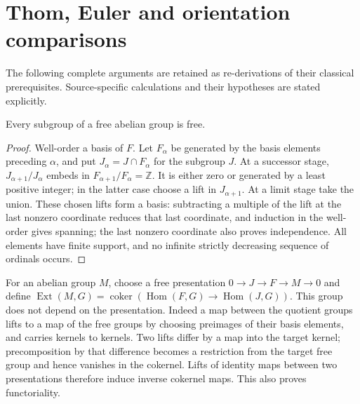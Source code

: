 \section{Thom, Euler and orientation comparisons}\label{courseIII:thom-euler-for-lesson11:section}

The following complete arguments are retained as re-derivations of their classical prerequisites. Source-specific calculations and their hypotheses are stated explicitly.

\label{courseIII:thom-euler-for-lesson11:CG-S6-CHAIN-LEMMA-5.1}

\begin{lemma}
Every subgroup of a free abelian group is free.
\end{lemma}
\begin{proof}
Well-order a basis of \(F\). Let \(F_\alpha\) be generated by the basis elements preceding \(\alpha\), and put \(J_\alpha=J\cap F_\alpha\) for the subgroup \(J\). At a successor stage,
\(J_{\alpha+1}/J_\alpha\) embeds in \(F_{\alpha+1}/F_\alpha=\mathbb Z\). It is either zero or generated by a least positive integer; in the latter case choose a lift in \(J_{\alpha+1}\). At a limit stage take the union. These chosen lifts form a basis: subtracting a multiple of the lift at the last nonzero coordinate reduces that last coordinate, and induction in the well-order gives spanning; the last nonzero coordinate also proves independence. All elements have finite support, and no infinite strictly decreasing sequence of ordinals occurs.
\end{proof}

For an abelian group \(M\), choose a free presentation \(0\to J\to F\to M\to0\) and define
\(\operatorname{Ext}(M,G)=\operatorname{coker}(\operatorname{Hom}(F,G)\to\operatorname{Hom}(J,G))\).
This group does not depend on the presentation. Indeed a map between the quotient groups lifts to a map of the free groups by choosing preimages of their basis elements, and carries kernels to kernels. Two lifts differ by a map into the target kernel; precomposition by that difference becomes a restriction from the target free group and hence vanishes in the cokernel. Lifts of identity maps between two presentations therefore induce inverse cokernel maps. This also proves functoriality.

\label{courseIII:thom-euler-for-lesson11:CG-S6-CHAIN-THEOREM-5.2}

